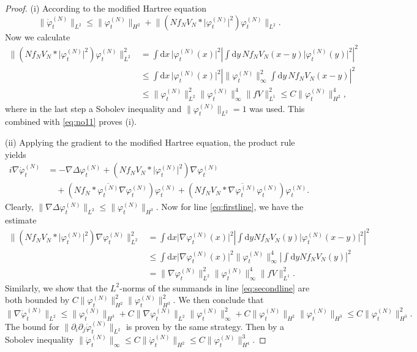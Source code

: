 \documentclass[11pt,a4paper,DIV11]{scrartcl}	%
\newcommand{\di}{\textrm{d}}		%
\newcommand{\cc}[1]{\overline{#1}}	%
\newcommand{\norm}[1]{\lVert#1\rVert}	%
\newcommand{\ph}{\varphi_t^{(N)}}	%
\newcommand{\phdot}{\dot{\varphi}_t^{(N)}}	%
\newcommand{\be}[1]{\begin{equation}\label{eq:#1}}	%
\newcommand{\ee}{\end{equation}}
\newcommand{\eqr}[1]{\eqref{eq:#1}}			%
\begin{document}
\begin{proof}(i) According to the modified Hartree equation
\be{no11}
\norm{\phdot}_{L^2} \leq \norm{\ph}_{H^2} + \norm{\left(N f_N V_N \ast \lvert \ph\rvert^2 \right)\ph}_{L^2}.
\ee
Now we calculate
\begin{align*}
\norm{\left(N f_N V_N \ast \lvert \ph\rvert^2 \right)\ph}_{L^2}^2 & = \int \di x\, \lvert \ph(x)\rvert^2 \left\lvert \int \di y\, N f_NV_N(x-y) \lvert \ph(y)\rvert^2 \right\rvert^2 \\
& \leq \int \di x\, \lvert \ph(x)\rvert^2 \left\lvert \norm{\ph}_\infty^2 \int \di y\, N f_N V_N(x-y) \right\rvert^2 \\
& \leq \norm{\ph}_{L^2}^2 \norm{\ph}_\infty^4 \norm{fV}_{L^1}^2 \leq C \norm{\ph}_{H^2}^4,
\end{align*}
where in the last step a Sobolev inequality and $\norm{\ph}_{L^2} = 1$ was used.
This combined with \eqr{no11} proves (i).

(ii)
Applying the gradient to the modified Hartree equation, the product rule yields
\begin{align}
i \nabla \phdot & = - \nabla \Delta \ph + \left( N f_N V_N \ast \lvert \ph \rvert^2 \right) \nabla \ph \label{eq:firstline}\\
& \quad + \left( N f_N \ast \cc{\ph} \nabla \ph \right) \ph + \left( N f_N V_N \ast \cc{\nabla \ph} \ph \right) \ph. \label{eq:secondline}
\end{align}
Clearly, $\norm{\nabla \Delta \ph}_{L^2} \leq \norm{\ph}_{H^3}$. Now for line \eqref{eq:firstline}, we have the estimate
\begin{align*}
\norm{\left( N f_N V_N \ast \lvert \ph \rvert^2 \right)\nabla \ph}_{L^2}^2 & = \int \di x \lvert \nabla \ph(x)\rvert^2 \left\lvert \int \di y N f_N V_N(y) \lvert\ph(x-y) \rvert^2\right\rvert^2\\
& \leq \int \di x \lvert \nabla \ph(x)\rvert^2 \norm{\ph}_\infty^4 \left\lvert \int \di y N f_N V_N(y) \right\rvert^2 \\
& = \norm{\nabla \ph}_{L^2}^2 \norm{\ph}_\infty^4 \norm{fV}_{L^1}^2. 
\end{align*}
Similarly, we show that the $L^2$-norms of the summands in line \eqref{eq:secondline} are both bounded by $C \norm{\ph}_{H^2}^2 \norm{\ph}_{H^3}^2$. We then conclude that
\[
\norm{\nabla \phdot}_{L^2} \leq \norm{\ph}_{H^3} + C \norm{\nabla \ph}_{L^2} \norm{\ph}_\infty^2 + C \norm{\ph}_{H^2} \norm{\ph}_{H^3} \leq C \norm{\ph}_{H^3}^2.
\]
The bound for $\norm{\partial_i \partial_j \phdot}_{L^2}$ is proven by the same strategy.
Then by a Sobolev inequality $\norm{\phdot}_\infty \leq C \norm{\phdot}_{H^2} \leq C \norm{\ph}_{H^4}^3$.


\end{proof}
\end{document}
